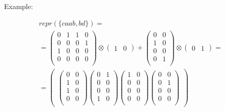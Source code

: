 \documentclass[leqno]{article}
\begin{document}
Example:

\begin{multline}\label{eq:4}
    repr(\{caab, bd\}) = \\
    =
    \begin{pmatrix}
    0 & 1 & 1 & 0 \\
    0 & 0 & 0 & 1 \\
    1 & 0 & 0 & 0 \\
    0 & 0 & 0 & 0 \\
    \end{pmatrix}
    \otimes
    \begin{pmatrix} 1 & 0 \end{pmatrix}
    +
    \begin{pmatrix}
    0 & 0 \\
    1 & 0 \\
    0 & 0 \\
    0 & 1 \\
    \end{pmatrix}
    \otimes
    \begin{pmatrix} 0 & 1 \end{pmatrix} = \\
    =
    \begin{pmatrix}
    \begin{pmatrix}
    0 & 0 \\
    1 & 0 \\
    1 & 0 \\
    0 & 0 \\
    \end{pmatrix}
    \begin{pmatrix}
    0 & 1 \\
    0 & 0 \\
    0 & 0 \\
    1 & 0 \\
    \end{pmatrix}
    \begin{pmatrix}
    1 & 0 \\
    0 & 0 \\
    0 & 0 \\
    0 & 0 \\
    \end{pmatrix}
    \begin{pmatrix}
    0 & 0 \\
    0 & 1 \\
    0 & 0 \\
    0 & 0 \\
    \end{pmatrix}
    \end{pmatrix}
\end{multline}
\end{document}
